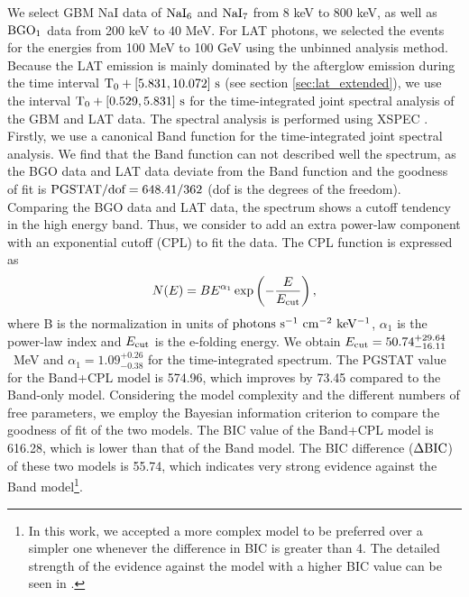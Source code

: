 \documentclass[twocolumn]{aastex631}
\begin{document}
We select  GBM NaI data of $\rm NaI_6$ and $\rm NaI_7$  from 8 keV to  800 keV, as well as $\rm BGO_1$ data from 200 keV to 40 MeV. 
For LAT photons, we  selected the events for the energies from 100 MeV to 100 GeV using the unbinned analysis method. Because  the LAT emission is mainly dominated by the afterglow emission during the time interval $\rm T_0 + [5.831,10.072]~s$ (see section \ref{sec:lat_extended}), we use the interval $\rm T_0 + [0.529,5.831]~s$  for the time-integrated joint spectral analysis of the GBM and LAT data. The spectral analysis is performed using XSPEC \citep[version 12.13.0c;][]{1996ASPC..101...17A}.
Firstly, we use a canonical Band function \citep{1993ApJ...413..281B} for the time-integrated joint spectral analysis. 
We find that the Band function can not  described well the spectrum, as the BGO data and LAT data deviate from the Band function and the goodness of fit is $\rm PGSTAT/dof = 648.41/362$ (dof is the degrees of the freedom). Comparing the BGO data and LAT data, the spectrum shows a cutoff tendency in the high energy band. Thus, we consider to add an extra power-law component with an exponential cutoff (CPL) to fit the data. The CPL function is expressed as
\begin{equation}
\label{eq:cpl}
N(E) = BE^{\alpha_1}\exp\left(-\frac{E}{E_{\rm cut}}\right),
\end{equation}
where B is the normalization in units of $\rm photons~s^{-1}~cm^{-2}~keV^{-1}$, $\alpha_1$ is the power-law index and $E_{\rm cut}$ is the e-folding energy. We obtain $E_{\rm cut}=50.74_{-16.11}^{+29.64}$~MeV and $\alpha_1 = 1.09_{-0.38}^{+0.26}$ for the time-integrated spectrum.
The PGSTAT value for the Band+CPL model is 574.96, which improves by 73.45 compared to the Band-only model. Considering the model
complexity and the different numbers of free parameters, we employ the
Bayesian information criterion \citep[BIC;][]{1978AnSta...6..461S} to compare the goodness of fit of the two models. The BIC value of the Band+CPL model is 616.28, which is lower than that of the Band model. The BIC difference ($\Delta \rm BIC$) of these two models is 55.74, which indicates  very strong evidence
against the Band model\footnote{In this work, we accepted a more complex model to be preferred over a simpler one whenever the difference in BIC is greater than 4.
The detailed strength of the evidence against the model with a higher BIC value can be seen in \citet{2017JCAP...01..005N}.}.
\end{document}

